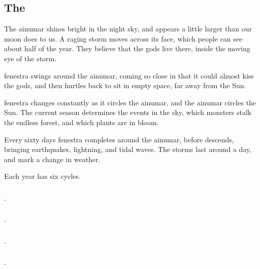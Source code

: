 \begin{multicols}{2}

\subsection{The }

\begin{exampletext}
  The \gls{ainumar} shines bright in the night sky, and appears a little larger than our moon does to us.
  A raging storm moves across its face, which people can see about half of the year.
  They believe that the gods live there, inside the moving eye of the storm.

  \Gls{fenestra} swings around the \gls{ainumar}, coming so close in that it could almost kiss the gods, and then hurtles back to sit in empty space, far away from the Sun.
\end{exampletext}

\Gls{fenestra} changes constantly as it circles the \gls{ainumar}, and the \gls{ainumar} circles the Sun.
The current season determines the events in the sky, which \glspl{monster} stalk the endless forest, and which plants are in bloom.

Every sixty days \gls{fenestra} completes  around the \gls{ainumar}, before  descends, bringing earthquakes, lightning, and tidal waves.
The \glspl{storm} last around a day, and mark a change in weather.

Each year has six \glspl{cycle}.

\subsubsection{}
.

\subsubsection{}
.

\subsubsection{}
.

\subsubsection{}
.


\end{multicols}
